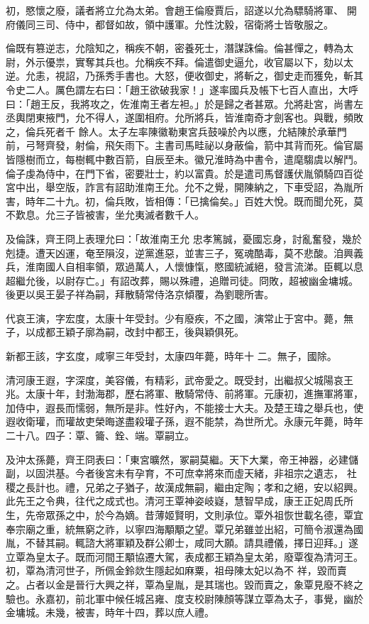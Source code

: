 \begin{pinyinscope}
 初，愍懷之廢，議者將立允為太弟。會趙王倫廢賈后，詔遂以允為驃騎將軍、
 開府儀同三司、侍中，都督如故，領中護軍。允性沈毅，宿衛將士皆敬服之。



 倫既有篡逆志，允陰知之，稱疾不朝，密養死士，潛謀誅倫。倫甚憚之，轉為太尉，外示優祟，實奪其兵也。允稱疾不拜。倫遣御史逼允，收官屬以下，劾以太逆。允恚，視詔，乃孫秀手書也。大怒，便收御史，將斬之，御史走而獲免，斬其令史二人。厲色謂左右曰：「趙王欲破我家！」遂率國兵及帳下七百人直出，大呼曰：「趙王反，我將攻之，佐淮南王者左袒。」於是歸之者甚眾。允將赴宮，尚書左丞輿閉東掖門，允不得人，遂圍相府。允所將兵，皆淮南奇才劍客也。與戰，頻敗之，倫兵死者千
 餘人。太子左率陳徽勒東宮兵鼓噪於內以應，允結陳於承華門前，弓弩齊發，射倫，飛矢雨下。主書司馬畦祕以身蔽倫，箭中其背而死。倫官屬皆隱樹而立，每樹輒中數百箭，自辰至未。徽兄淮時為中書令，遣麾騶虞以解鬥。倫子虔為侍中，在門下省，密要壯士，約以富貴。於是遣司馬督護伏胤領騎四百從宮中出，舉空版，詐言有詔助淮南王允。允不之覺，開陳納之，下車受詔，為胤所害，時年二十九。初，倫兵敗，皆相傳：「已擒倫矣。」百姓大悅。既而聞允死，莫不歎息。允三子皆被害，坐允夷滅者數千人。



 及倫誅，齊王冏上表理允曰：「故淮南王允
 忠孝篤誠，憂國忘身，討亂奮發，幾於剋捷。遭天凶運，奄至隕沒，逆黨進惡，並害三子，冤魂酷毒，莫不悲酸。洎興義兵，淮南國人自相率領，眾過萬人，人懷慷愾，愍國統滅絕，發言流涕。臣輒以息超繼允後，以尉存亡。」有詔改葬，賜以殊禮，追贈司徒。冏敗，超被幽金墉城。後更以吳王晏子祥為嗣，拜散騎常侍洛京傾覆，為劉聰所害。



 代哀王演，字宏度，太康十年受封。少有廢疾，不之國，演常止于宮中。薨，無子，以成都王穎子廓為嗣，改封中都王，後與穎俱死。



 新都王該，字玄度，咸寧三年受封，太康四年薨，時年十
 二。無子，國除。



 清河康王遐，字深度，美容儀，有精彩，武帝愛之。既受封，出繼叔父城陽哀王兆。太康十年，封渤海郡，歷右將軍、散騎常侍、前將軍。元康初，進撫軍將軍，加侍中，遐長而懦弱，無所是非。性好內，不能接士大夫。及楚王瑋之舉兵也，使遐收衛瓘，而瓘故吏榮晦遂盡殺瓘子孫，遐不能禁，為世所尤。永康元年薨，時年二十八。四子：覃、籥、銓、端。覃嗣立。



 及沖太孫薨，齊王冏表曰：「東宮曠然，冢嗣莫繼。天下大業，帝王神器，必建儲副，以固洪基。今者後宮未有孕育，不可庶幸將來而虛天緒，非祖宗之遺志，
 社稷之長計也。禮，兄弟之子猶子，故漢成無嗣，繼由定陶；孝和之絕，安以紹興。此先王之令典，往代之成式也。清河王覃神姿岐嶷，慧智早成，康王正妃周氏所生，先帝眾孫之中，於今為嫡。昔薄姬賢明，文則承位。覃外祖恢世載名德，覃宜奉宗廟之重，統無窮之祚，以寧四海顒顒之望。覃兄弟雖並出紹，可簡令淑還為國胤，不替其嗣。輒諮大將軍穎及群公卿士，咸同大願。請具禮儀，擇日迎拜。」遂立覃為皇太子。既而河間王顒協遷大駕，表成都王穎為皇太弟，廢覃復為清河王。初，覃為清河世子，所佩金鈴欻生隱起如麻粟，祖母陳太妃以為不
 祥，毀而賣之。占者以金是晉行大興之祥，覃為皇胤，是其瑞也。毀而賣之，象覃見廢不終之驗也。永嘉初，前北軍中候任城呂雍、度支校尉陳顏等謀立覃為太子，事覺，幽於金墉城。未幾，被害，時年十四，葬以庶人禮。




\end{pinyinscope}
